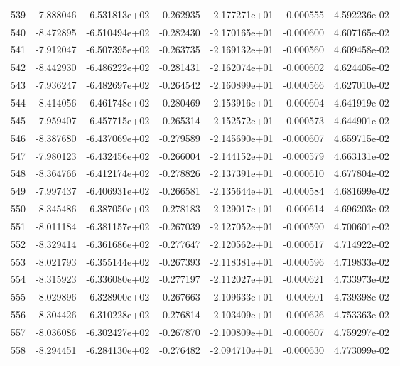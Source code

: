 \begin{tabular}{rrrrrrr}
 539 &  -7.888046 & -6.531813e+02 & -0.262935 & -2.177271e+01 &   -0.000555 &  4.592236e-02 \\
 540 &  -8.472895 & -6.510494e+02 & -0.282430 & -2.170165e+01 &   -0.000600 &  4.607165e-02 \\
 541 &  -7.912047 & -6.507395e+02 & -0.263735 & -2.169132e+01 &   -0.000560 &  4.609458e-02 \\
 542 &  -8.442930 & -6.486222e+02 & -0.281431 & -2.162074e+01 &   -0.000602 &  4.624405e-02 \\
 543 &  -7.936247 & -6.482697e+02 & -0.264542 & -2.160899e+01 &   -0.000566 &  4.627010e-02 \\
 544 &  -8.414056 & -6.461748e+02 & -0.280469 & -2.153916e+01 &   -0.000604 &  4.641919e-02 \\
 545 &  -7.959407 & -6.457715e+02 & -0.265314 & -2.152572e+01 &   -0.000573 &  4.644901e-02 \\
 546 &  -8.387680 & -6.437069e+02 & -0.279589 & -2.145690e+01 &   -0.000607 &  4.659715e-02 \\
 547 &  -7.980123 & -6.432456e+02 & -0.266004 & -2.144152e+01 &   -0.000579 &  4.663131e-02 \\
 548 &  -8.364766 & -6.412174e+02 & -0.278826 & -2.137391e+01 &   -0.000610 &  4.677804e-02 \\
 549 &  -7.997437 & -6.406931e+02 & -0.266581 & -2.135644e+01 &   -0.000584 &  4.681699e-02 \\
 550 &  -8.345486 & -6.387050e+02 & -0.278183 & -2.129017e+01 &   -0.000614 &  4.696203e-02 \\
 551 &  -8.011184 & -6.381157e+02 & -0.267039 & -2.127052e+01 &   -0.000590 &  4.700601e-02 \\
 552 &  -8.329414 & -6.361686e+02 & -0.277647 & -2.120562e+01 &   -0.000617 &  4.714922e-02 \\
 553 &  -8.021793 & -6.355144e+02 & -0.267393 & -2.118381e+01 &   -0.000596 &  4.719833e-02 \\
 554 &  -8.315923 & -6.336080e+02 & -0.277197 & -2.112027e+01 &   -0.000621 &  4.733973e-02 \\
 555 &  -8.029896 & -6.328900e+02 & -0.267663 & -2.109633e+01 &   -0.000601 &  4.739398e-02 \\
 556 &  -8.304426 & -6.310228e+02 & -0.276814 & -2.103409e+01 &   -0.000626 &  4.753363e-02 \\
 557 &  -8.036086 & -6.302427e+02 & -0.267870 & -2.100809e+01 &   -0.000607 &  4.759297e-02 \\
 558 &  -8.294451 & -6.284130e+02 & -0.276482 & -2.094710e+01 &   -0.000630 &  4.773099e-02 \\

\end{tabular}
